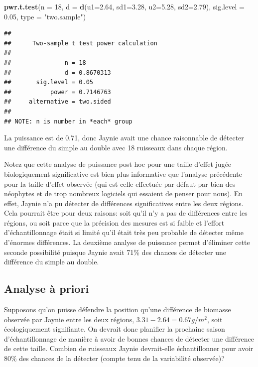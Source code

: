 \documentclass[12pt,]{book}
\newenvironment{Shaded}{\begin{snugshade}}{\end{snugshade}}
\newcommand{\DataTypeTok}[1]{\textcolor[rgb]{0.13,0.29,0.53}{#1}}
\newcommand{\DecValTok}[1]{\textcolor[rgb]{0.00,0.00,0.81}{#1}}
\newcommand{\FloatTok}[1]{\textcolor[rgb]{0.00,0.00,0.81}{#1}}
\newcommand{\KeywordTok}[1]{\textcolor[rgb]{0.13,0.29,0.53}{\textbf{#1}}}
\newcommand{\NormalTok}[1]{#1}
\newcommand{\StringTok}[1]{\textcolor[rgb]{0.31,0.60,0.02}{#1}}
\begin{document}
\begin{Shaded}
\begin{Highlighting}[]
\KeywordTok{pwr.t.test}\NormalTok{(}\DataTypeTok{n =} \DecValTok{18}\NormalTok{, }\DataTypeTok{d =} \KeywordTok{d}\NormalTok{(}\DataTypeTok{u1=}\FloatTok{2.64}\NormalTok{, }\DataTypeTok{sd1=}\FloatTok{3.28}\NormalTok{, }\DataTypeTok{u2=}\FloatTok{5.28}\NormalTok{, }\DataTypeTok{sd2=}\FloatTok{2.79}\NormalTok{), }\DataTypeTok{sig.level =} \FloatTok{0.05}\NormalTok{, }\DataTypeTok{type =} \StringTok{"two.sample"}\NormalTok{)}
\end{Highlighting}
\end{Shaded}

\begin{verbatim}
## 
##      Two-sample t test power calculation 
## 
##               n = 18
##               d = 0.8670313
##       sig.level = 0.05
##           power = 0.7146763
##     alternative = two.sided
## 
## NOTE: n is number in *each* group
\end{verbatim}

La puissance est de 0.71, donc Jaynie avait une chance raisonnable de détecter une différence du simple au double avec 18 ruisseaux dans chaque région.

Notez que cette analyse de puissance post hoc pour une taille d'effet jugée biologiquement significative est bien plus informative que l'analyse précédente pour la taille d'effet observée (qui est celle effectuée par défaut par bien des néophytes et de trop nombreux logiciels qui essaient de penser pour nous).
En effet, Jaynie n'a pu détecter de différences significatives entre les deux régions.
Cela pourrait être pour deux raisons: soit qu'il n'y a pas de différences entre les régions, ou soit parce que la précision des mesures est si faible et l'effort d'échantillonnage était si limité qu'il était très peu probable de détecter même d'énormes différences.
La deuxième analyse de puissance permet d'éliminer cette seconde possibilité puisque Jaynie avait 71\% des chances de détecter une différence du simple au double.

\hypertarget{analyse-uxe0-priori}{%
\subsection{Analyse à priori}\label{analyse-uxe0-priori}}

Supposons qu'on puisse défendre la position qu'une différence de biomasse observée par Jaynie entre les deux régions, \(3.31- 2.64=0.67g/m^2\), soit écologiquement signifiante.
On devrait donc planifier la prochaine saison d'échantillonnage de manière à avoir de bonnes chances de détecter une différence de cette taille.
Combien de ruisseaux Jaynie devrait-elle échantillonner pour avoir 80\% des chances de la détecter (compte tenu de la variabilité observée)?
\end{document}
